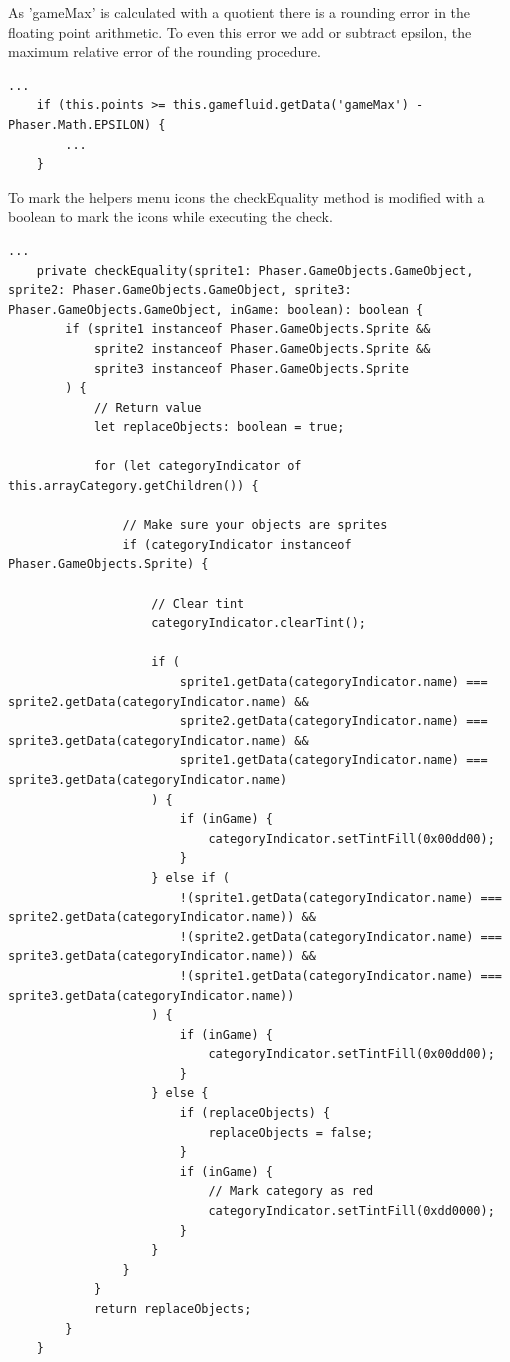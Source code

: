 As 'gameMax' is calculated with a quotient there is a rounding error in the floating point arithmetic.
To even this error we add or subtract epsilon, the maximum relative error of the rounding procedure.

\begin{lstlisting}[style=TypeScript, caption={updateProgressbar (gameScene.ts)}]
    ...
    if (this.points >= this.gamefluid.getData('gameMax') - Phaser.Math.EPSILON) {
        ...
    }
\end{lstlisting}

To mark the helpers menu icons the checkEquality method is modified
with a boolean to mark the icons while executing the check.

\begin{lstlisting}[style=TypeScript, caption={checkEquality (gameScene.ts)}]
    ...
    private checkEquality(sprite1: Phaser.GameObjects.GameObject, sprite2: Phaser.GameObjects.GameObject, sprite3: Phaser.GameObjects.GameObject, inGame: boolean): boolean {
        if (sprite1 instanceof Phaser.GameObjects.Sprite &&
            sprite2 instanceof Phaser.GameObjects.Sprite &&
            sprite3 instanceof Phaser.GameObjects.Sprite
        ) {
            // Return value
            let replaceObjects: boolean = true;

            for (let categoryIndicator of this.arrayCategory.getChildren()) {

                // Make sure your objects are sprites
                if (categoryIndicator instanceof Phaser.GameObjects.Sprite) {

                    // Clear tint
                    categoryIndicator.clearTint();

                    if (
                        sprite1.getData(categoryIndicator.name) === sprite2.getData(categoryIndicator.name) &&
                        sprite2.getData(categoryIndicator.name) === sprite3.getData(categoryIndicator.name) &&
                        sprite1.getData(categoryIndicator.name) === sprite3.getData(categoryIndicator.name)
                    ) {
                        if (inGame) {
                            categoryIndicator.setTintFill(0x00dd00);
                        }
                    } else if (
                        !(sprite1.getData(categoryIndicator.name) === sprite2.getData(categoryIndicator.name)) &&
                        !(sprite2.getData(categoryIndicator.name) === sprite3.getData(categoryIndicator.name)) &&
                        !(sprite1.getData(categoryIndicator.name) === sprite3.getData(categoryIndicator.name))
                    ) {
                        if (inGame) {
                            categoryIndicator.setTintFill(0x00dd00);
                        }
                    } else {
                        if (replaceObjects) {
                            replaceObjects = false;
                        }
                        if (inGame) {
                            // Mark category as red
                            categoryIndicator.setTintFill(0xdd0000);
                        }
                    }
                }
            }
            return replaceObjects;
        }
    }
\end{lstlisting}

